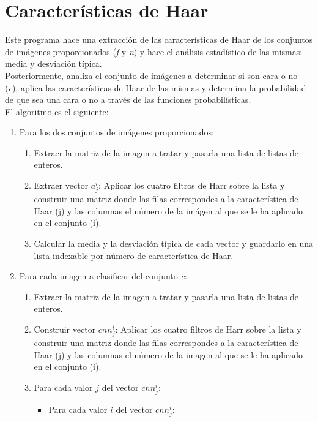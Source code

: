 \documentclass[10pt,a4paper]{article}
\begin{document}
\pagebreak
\appendix
\section{Características de Haar}
\label{ann:haar}
Este programa hace una extracción de las características de Haar de los conjuntos de imágenes proporcionados (\textit{f} y \textit{n}) y hace el análisis estadístico de las mismas: media y desviación típica.\\
Posteriormente, analiza el conjunto de imágenes a determinar si son cara o no (\textit{c}), aplica las características de Haar de las mismas y determina la probabilidad de que sea una cara o no a través de las funciones probabilísticas.\\

El algoritmo es el siguiente:
\begin{enumerate}
\item Para los dos conjuntos de imágenes proporcionados:
\begin{enumerate}[label=\roman*]
\item Extraer la matriz de la imagen a tratar y pasarla una lista de listas de enteros.
\item Extraer vector $a_{j}^i$: Aplicar los cuatro filtros de Harr sobre la lista y construir una matriz donde las filas correspondes a la característica de Haar (j) y las columnas el número de la imágen al que se le ha aplicado en el conjunto (i).
\item Calcular la media y la desviación típica de cada vector y guardarlo en una lista indexable por número de característica de Haar.
\end{enumerate}
\item Para cada imagen a clasificar del conjunto \textit{c}:
\begin{enumerate}[label=\roman*]
\item Extraer la matriz de la imagen a tratar y pasarla una lista de listas de enteros.
\item Construir vector $cnn_{j}^i$: Aplicar los cuatro filtros de Harr sobre la lista y construir una matriz donde las filas correspondes a la característica de Haar (j) y las columnas el número de la imagen al que se le ha aplicado en el conjunto (i).
\item Para cada valor $j$ del vector $cnn_{j}^i$:
\begin{itemize}
\item Para cada valor $i$ del vector $cnn_{j}^i$:
\begin{enumerate}[label=\roman*]

\end{enumerate}
\end{itemize}
\end{enumerate}
\end{enumerate}
\end{document}

